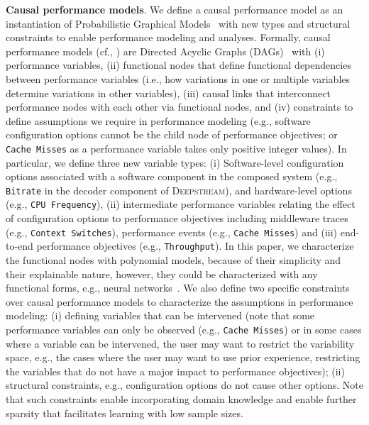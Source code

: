 \textbf{Causal performance models}. We define a causal performance model as an instantiation of Probabilistic Graphical Models~\cite{pearl1998graphical} with new types and structural constraints to enable performance modeling and analyses. Formally, causal performance models (cf., ) are Directed Acyclic Graphs (DAGs)~\cite{pearl1998graphical} with (i) performance variables, (ii) functional nodes that define functional dependencies between performance variables (i.e., how variations in one or multiple variables determine variations in other variables), (iii) causal links that interconnect performance nodes with each other via functional nodes, and (iv) constraints to define assumptions we require in performance modeling (e.g., software configuration options cannot be the child node of performance objectives; or \texttt{Cache Misses} as a performance variable takes only positive integer values). In particular, we define three new variable types: (i) Software-level configuration options associated with a software component in the composed system (e.g., \texttt{Bitrate} in the decoder component of \textsc{Deepstream}), and hardware-level options (e.g., \texttt{CPU Frequency}), (ii) intermediate performance variables relating the effect of configuration options to performance objectives including middleware traces (e.g., \texttt{Context Switches}), performance events (e.g., \texttt{Cache Misses}) and (iii) end-to-end performance objectives (e.g., \texttt{Throughput}). In this paper, we characterize the functional nodes with polynomial models, because of their simplicity and their explainable nature, however, they could be characterized with any functional forms, e.g., neural networks~\cite{xia2021causal,scherrer2021learning}. We also define two specific constraints over causal performance models to characterize the assumptions in performance modeling: (i) defining variables that can be intervened (note that some performance variables can only be observed (e.g., \texttt{Cache Misses}) or in some cases where a variable can be intervened, the user may want to restrict the variability space, e.g., the cases where the user may want to use prior experience, restricting the variables that do not have a major impact to performance objectives); (ii) structural constraints, e.g., configuration options do not cause other options. Note that such constraints enable incorporating domain knowledge and enable further sparsity that facilitates learning with low sample sizes.


